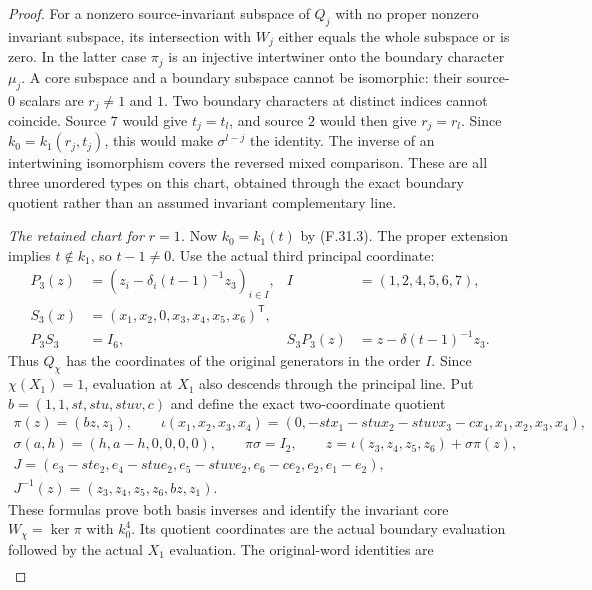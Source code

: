 \begin{proof}
For a nonzero source-invariant subspace
of $Q_j$ with no proper nonzero invariant
subspace, its intersection with $W_j$
either equals the whole subspace or is
zero. In the latter case $\pi_j$ is an
injective intertwiner onto the boundary
character $\mu_j$.
A core subspace and a boundary subspace
cannot be isomorphic: their source-$0$
scalars are $r_j\ne1$ and $1$.
Two boundary characters at distinct
indices cannot coincide. Source $7$
would give $t_j=t_l$, and source $2$
would then give $r_j=r_l$. Since
$k_0=k_1(r_j,t_j)$, this would make
$\sigma^{l-j}$ the identity.
The inverse of an intertwining isomorphism
covers the reversed mixed comparison.
These are all three unordered types on
this chart, obtained through the exact
boundary quotient rather than an assumed
invariant complementary line.

\emph{The retained chart for $r=1$.}
Now $k_0=k_1(t)$ by (F.31.3).
The proper extension implies $t\notin k_1$,
so $t-1\ne0$.
Use the actual third principal coordinate:
\[
 \begin{aligned}
 P_3(z)&=(z_i-\delta_i(t-1)^{-1}z_3)_{i\in I},
       &I&=(1,2,4,5,6,7),\\
 S_3(x)&=(x_1,x_2,0,x_3,x_4,x_5,x_6)^{\mathsf T},\\
 P_3S_3&=I_6,
       &S_3P_3(z)&=z-\delta(t-1)^{-1}z_3.
 \end{aligned}                                                \tag{F.31.18}
\]
Thus $Q_\chi$ has the coordinates of the
original generators in the order $I$.
Since $\chi(X_1)=1$, evaluation at $X_1$
also descends through the principal line.
Put $b=(1,1,st,stu,stuv,c)$ and define
the exact two-coordinate quotient
\[
 \begin{gathered}
 \pi(z)=(bz,z_1),\qquad
 \iota(x_1,x_2,x_3,x_4)=
 (0,-stx_1-stux_2-stuvx_3-cx_4,x_1,x_2,x_3,x_4),\\
 \sigma(a,h)=(h,a-h,0,0,0,0),\qquad
 \pi\sigma=I_2,\qquad
 z=\iota(z_3,z_4,z_5,z_6)+\sigma\pi(z),\\
 J=(e_3-ste_2,e_4-stue_2,e_5-stuve_2,
                         e_6-ce_2,e_2,e_1-e_2),\\
 J^{-1}(z)=(z_3,z_4,z_5,z_6,bz,z_1).
 \end{gathered}                                                \tag{F.31.19}
\]
These formulas prove both basis inverses
and identify the invariant core
$W_\chi=\ker\pi$ with $k_0^4$.
Its quotient coordinates are the actual
boundary evaluation followed by the
actual $X_1$ evaluation.
The original-word identities are
\[
 \begin{gathered}

\end{gathered}\]
\end{proof}
